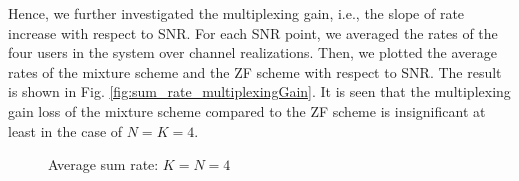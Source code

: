 \documentclass[11pt, draft, onecolumn ]{IEEEtran}
\def\scalefig#1{\epsfxsize #1\textwidth}
\begin{document}
Hence, we further investigated the multiplexing gain, i.e., the slope of rate increase with respect to SNR. For each SNR point, we averaged the rates of the four users in the system over channel realizations. Then, we plotted the average rates of the mixture scheme and the ZF scheme with respect to SNR. The result is shown in Fig. \ref{fig:sum_rate_multiplexingGain}. It is seen that  the multiplexing gain loss of the mixture scheme compared to the ZF scheme is insignificant at least in the case of $N=K=4$.


\begin{figure}[ht]
\begin{psfrags}
    \centerline{ \scalefig{0.6}  }
    \caption{{Average sum rate: $K=N=4$}}
    \label{fig:sum_rate_multiplexingGainProblem16}
\end{psfrags}
\end{figure}
\end{document}
